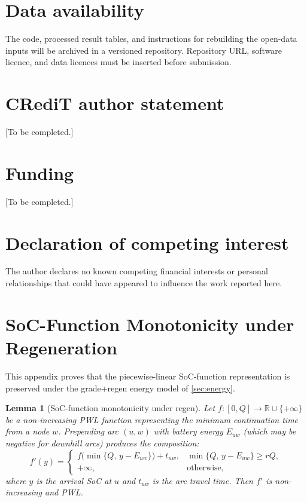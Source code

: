 \documentclass[review,3p,authoryear]{elsarticle}
\newtheorem{lemma}[theorem]{Lemma}
\begin{document}
\section*{Data availability}
The code, processed result tables, and instructions for rebuilding the
open-data inputs will be archived in a versioned repository.  Repository URL,
software licence, and data licences must be inserted before submission.

\section*{CRediT author statement}
[To be completed.]

\section*{Funding}
[To be completed.]

\section*{Declaration of competing interest}
The author declares no known competing financial interests or personal
relationships that could have appeared to influence the work reported here.




\appendix

\section{SoC-Function Monotonicity under Regeneration}
\label{app:frvcp}

This appendix proves that the piecewise-linear SoC-function representation
is preserved under the grade+regen energy model of \cref{sec:energy}.

\begin{lemma}[SoC-function monotonicity under regen]
\label{lem:monotone}
Let $f: [0, Q] \to \mathbb{R} \cup \{+\infty\}$ be a non-increasing PWL
function representing the minimum continuation time from a node $w$.
Prepending arc $(u, w)$ with battery energy $E_{uw}$
(which may be negative for downhill arcs) produces the composition:
\begin{equation}
f'(y)=
\begin{cases}
f\bigl(\min\{Q,\,y-E_{uw}\}\bigr)+t_{uw},
  & \min\{Q,\,y-E_{uw}\}\ge rQ,\\
+\infty, & \text{otherwise},
\end{cases}
\end{equation}
where $y$ is the arrival SoC at $u$ and $t_{uw}$ is the arc travel time.
Then $f'$ is non-increasing and PWL.
\end{lemma}
\end{document}
